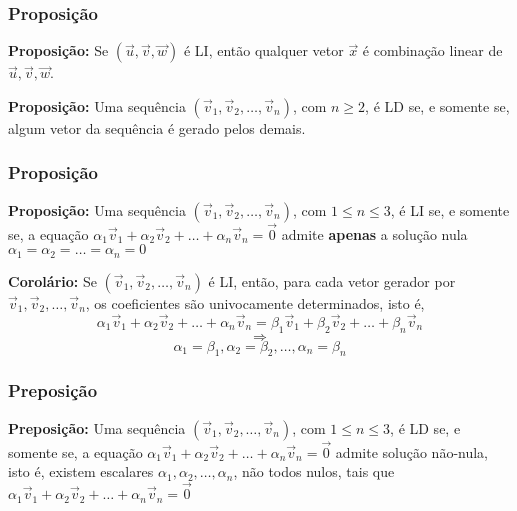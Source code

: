 \documentclass[hyperref={pdfpagelabels=false}]{beamer}
\begin{document}
\begin{frame}
\frametitle{Proposição}

{\bf Proposição: } Se $(\overrightarrow{u},\overrightarrow{v},\overrightarrow{w})$ é LI, então qualquer vetor $\overrightarrow{x}$ é combinação linear de $\overrightarrow{u},\overrightarrow{v},\overrightarrow{w}$.

\pause

{\bf Proposição: } Uma sequência $(\overrightarrow{v}_1,\overrightarrow{v}_2,\dots,\overrightarrow{v}_n)$, com $n \geq 2$, é LD se, e somente se, algum vetor da sequência é gerado pelos demais.


\end{frame}

\begin{frame}
\frametitle{Proposição}
{\bf Proposição: } Uma sequência $(\overrightarrow{v}_1,\overrightarrow{v}_2,\dots,\overrightarrow{v}_n)$, com $1 \leq n \leq 3$, é LI se, e somente se, a equação $\alpha_1\overrightarrow{v}_1 + \alpha_2\overrightarrow{v}_2+\dots+\alpha_n\overrightarrow{v}_n = \overrightarrow{0}$ admite {\bf apenas} a solução nula $\alpha_1=\alpha_2=\dots=\alpha_n=0$

\pause

{\bf Corolário: } Se $(\overrightarrow{v}_1,\overrightarrow{v}_2,\dots,\overrightarrow{v}_n)$ é LI, então, para cada vetor gerador por $\overrightarrow{v}_1,\overrightarrow{v}_2,\dots,\overrightarrow{v}_n$, os coeficientes são univocamente determinados, isto é,
$$\alpha_1\overrightarrow{v}_1 + \alpha_2\overrightarrow{v}_2+\dots+\alpha_n\overrightarrow{v}_n = \beta_1\overrightarrow{v}_1 + \beta_2\overrightarrow{v}_2+\dots+\beta_n\overrightarrow{v}_n$$ $$\Rightarrow$$ $$\alpha_1 = \beta_1, \alpha_2=\beta_2,\dots,\alpha_n=\beta_n$$

\end{frame}

\begin{frame}
\frametitle{Preposição}

{\bf Preposição: } Uma sequência $(\overrightarrow{v}_1,\overrightarrow{v}_2,\dots,\overrightarrow{v}_n)$, com $1 \leq n \leq 3$, é LD se, e somente se, a equação $\alpha_1\overrightarrow{v}_1 + \alpha_2\overrightarrow{v}_2+\dots+\alpha_n\overrightarrow{v}_n = \overrightarrow{0}$ admite solução não-nula, isto é, existem escalares $\alpha_1,\alpha_2,\dots,\alpha_n$, não todos nulos, tais que  $\alpha_1\overrightarrow{v}_1 + \alpha_2\overrightarrow{v}_2+\dots+\alpha_n\overrightarrow{v}_n = \overrightarrow{0}$

\end{frame}
\end{document}

